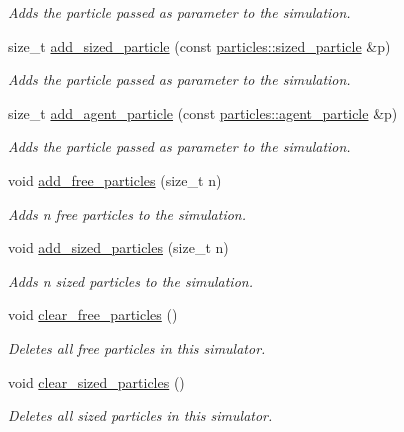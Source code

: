 \begin{DoxyCompactItemize}
\begin{DoxyCompactList}\small\item\em Adds the particle passed as parameter to the simulation. \end{DoxyCompactList}\item 
size\+\_\+t \hyperlink{classphysim_1_1simulator_aa7b066130ec71e7f8985ebc94605cf3b}{add\+\_\+sized\+\_\+particle} (const \hyperlink{classphysim_1_1particles_1_1sized__particle}{particles\+::sized\+\_\+particle} \&p)
\begin{DoxyCompactList}\small\item\em Adds the particle passed as parameter to the simulation. \end{DoxyCompactList}\item 
size\+\_\+t \hyperlink{classphysim_1_1simulator_a73e277b53d80d584fd8d72b586ff7b80}{add\+\_\+agent\+\_\+particle} (const \hyperlink{classphysim_1_1particles_1_1agent__particle}{particles\+::agent\+\_\+particle} \&p)
\begin{DoxyCompactList}\small\item\em Adds the particle passed as parameter to the simulation. \end{DoxyCompactList}\item 
void \hyperlink{classphysim_1_1simulator_a8729cd8c3590730d8897f61f2320f3e8}{add\+\_\+free\+\_\+particles} (size\+\_\+t n)
\begin{DoxyCompactList}\small\item\em Adds {\itshape n} free particles to the simulation. \end{DoxyCompactList}\item 
void \hyperlink{classphysim_1_1simulator_ae0551469d3c6b536da89bce04ff93fee}{add\+\_\+sized\+\_\+particles} (size\+\_\+t n)
\begin{DoxyCompactList}\small\item\em Adds {\itshape n} sized particles to the simulation. \end{DoxyCompactList}\item 
void \hyperlink{classphysim_1_1simulator_a3b6c748422ce495c2f26130136f6c460}{clear\+\_\+free\+\_\+particles} ()
\begin{DoxyCompactList}\small\item\em Deletes all free particles in this simulator. \end{DoxyCompactList}\item 
void \hyperlink{classphysim_1_1simulator_a4aa10ffe26a505dfa9ad5e6875a2964f}{clear\+\_\+sized\+\_\+particles} ()
\begin{DoxyCompactList}\small\item\em Deletes all sized particles in this simulator. \end{DoxyCompactList}\item 

\end{DoxyCompactItemize}
